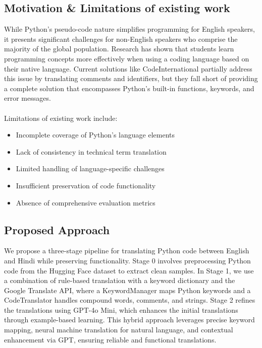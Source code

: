 \documentclass[11pt,a4paper]{article}
\begin{document}
            \subsection{Motivation \& Limitations of existing work} 
            While Python's pseudo-code nature simplifies programming for English speakers, it presents significant challenges for non-English speakers who comprise the majority of the global population. Research has shown that students learn programming concepts more effectively when using a coding language based on their native language. Current solutions like CodeInternational partially address this issue by translating comments and identifiers, but they fall short of providing a complete solution that encompasses Python's built-in functions, keywords, and error messages.\\ \\ 
            Limitations of existing work include:
            \begin{itemize}[itemsep=0pt, topsep=0pt]
                \item Incomplete coverage of Python's language elements
                \item Lack of consistency in technical term translation
                \item Limited handling of language-specific challenges
                \item Insufficient preservation of code functionality
                \item Absence of comprehensive evaluation metrics
            \end{itemize} 
            \subsection{Proposed Approach} 
            We propose a three-stage pipeline for translating Python code between English and Hindi while preserving functionality. Stage 0 involves preprocessing Python code from the Hugging Face dataset to extract clean samples. In Stage 1, we use a combination of rule-based translation with a keyword dictionary and the Google Translate API, where a KeywordManager maps Python keywords and a CodeTranslator handles compound words, comments, and strings. Stage 2 refines the translations using GPT-4o Mini, which enhances the initial translations through example-based learning. This hybrid approach leverages precise keyword mapping, neural machine translation for natural language, and contextual enhancement via GPT, ensuring reliable and functional translations.
            
\end{document}
